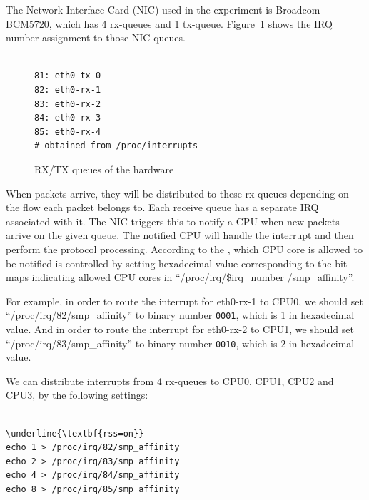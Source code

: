 The Network Interface Card (NIC) used in the experiment is Broadcom BCM5720, which has 4 rx-queues and 1 tx-queue.
Figure~\ref{fig:rx-queue} shows  the IRQ number assignment to those NIC queues.
 
\begin{figure}
\begin{minipage}{0.8\columnwidth}
\small
\begin{verbatim}

81: eth0-tx-0
82: eth0-rx-1
83: eth0-rx-2
84: eth0-rx-3
85: eth0-rx-4
# obtained from /proc/interrupts 

\end{verbatim}
\end{minipage}
\caption{RX/TX queues of the hardware}
\label{fig:rx-queue}
\end{figure}

When packets arrive, they will be distributed to these rx-queues depending on the flow each packet belongs to.
Each receive queue has a separate IRQ associated with it. The NIC triggers
this to notify a CPU when new packets arrive on the given queue.
The notified CPU will handle the interrupt and then perform the protocol processing. 
According to the \cite{TomHerbert}, which CPU core is allowed to be notified is controlled by setting 
hexadecimal value corresponding to the bit maps indicating allowed CPU cores in \enquote{/proc/irq/\$irq\_number /smp\_affinity}.

For example, in order to route the interrupt for eth0-rx-1 to CPU0, 
we should set \enquote{/proc/irq/82/smp\_affinity} 
to binary number {\tt 0001}, which is 1 in hexadecimal value.
And in order to route the interrupt for eth0-rx-2 to CPU1, we 
should set \enquote{/proc/irq/83/smp\_affinity} 
to binary number {\tt 0010}, which is 2 in hexadecimal value.

We can distribute interrupts from 4 rx-queues to CPU0, CPU1, CPU2 and CPU3, by the following settings: 

\begin{center}
\begin{minipage}{0.8\columnwidth}
\begin{Verbatim}[commandchars=\\\{\}]

\underline{\textbf{rss=on}}
echo 1 > /proc/irq/82/smp_affinity
echo 2 > /proc/irq/83/smp_affinity
echo 4 > /proc/irq/84/smp_affinity
echo 8 > /proc/irq/85/smp_affinity

\end{Verbatim}
\end{minipage}
\end{center}

